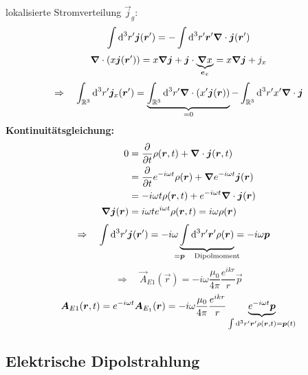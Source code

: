 lokalisierte Stromverteilung $ \vec{j}_g $:
\begin{equation*}
\int \textrm{d}^3 r' \bm{j}(\bm{r}') = - \int \textrm{d}^3 r' \bm{r}' \bm{\nabla} \cdot \bm{j}(\bm{r}')
\end{equation*}
\begin{equation*}
\bm{\nabla} \cdot ( x \bm{j}(\bm{r}')) = x \bm{\nabla} \bm{j} + \bm{j} \cdot \underbrace{\bm{\nabla} x}_{\bm{e}_x} = x \bm{\nabla} \bm{j} + j_x
\end{equation*}
\begin{equation*}
\Rightarrow \quad \int_{\mathbb{R}^3} \textrm{d}^3 r' \bm{j}_x(\bm{r}') = \underbrace{\int_{\mathbb{R}^3} \textrm{d}^3 r' \bm{\nabla} \cdot \left(x' \bm{j}(\bm{r})\right)}_{= 0} - \int_{\mathbb{R}^3} \textrm{d}^3 r' x' \bm{\nabla} \cdot \bm{j}
\end{equation*}
\textbf{Kontinuitätsgleichung:}
\begin{align*}
0 &= \frac{\partial }{\partial t} \rho(\bm{r},t) + \bm{\nabla} \cdot \bm{j}(\bm{r},t)\\
&= \frac{\partial }{\partial t} e^{-i\omega t} \rho(\bm{r}) + \bm{\nabla} e^{-i\omega t} \bm{j}(\bm{r})\\
&= - i \omega t \rho(\bm{r},t) + e^{- i \omega t} \bm{\nabla} \cdot \bm{j}(\bm{r})\\
\bm{\nabla} \bm{j}(\bm{r}) &= i \omega t e^{i \omega t} \rho(\bm{r},t) = i \omega \rho(\bm{r})
\end{align*}
\begin{align*}
\Rightarrow \quad \int \dd^3 r' \vec{j}(\vec{r}') &= - i \omega \ub{\int \dd^3 r' \vec{r}' \rho(\vec{r})}_{\mathclap{= \vec{p} \quad \tx{Dipolmoment}}} = - i \omega \vec{p}
\end{align*}
\begin{equation*}
\Rightarrow \quad \vec{A}_{E1} (\vec{r}) = - i \omega \frac{\mu_0}{4 \pi} \frac{e^{i k r}}{r} \vec{p}
\end{equation*}
\begin{equation*}
\bm{A}_{E1} (\bm{r},t) = e^{- i \omega t} \bm{A}_{E_1}(\bm{r}) = - i \omega \frac{\mu_0}{4 \pi} \frac{e^{i k r}}{r} \underbrace{e^{- i \omega t} \bm{p}}_{\int \textrm{d}^3 r' \bm{r}' \rho(\bm{r},t) = \bm{p}(t)}
\end{equation*}

\subsection{Elektrische Dipolstrahlung}

